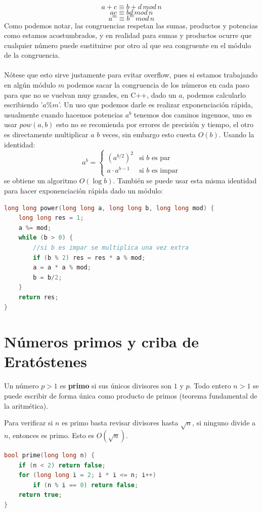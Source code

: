 \[a+c \equiv b+d \, mod \, n\]
\[ac \equiv bd \, mod \, n\]
\[a^m \equiv b^m \, mod \, n\]
Como podemos notar, las congruencias respetan las sumas, productos y potencias como estamos acostumbrados, y en realidad para sumas y productos ocurre que cualquier número puede sustituirse por otro al que sea congruente en el módulo de la congruencia.
\\\\
Nótese que esto sirve justamente para evitar overflow, pues si estamos trabajando en algún módulo $m$ podemos sacar la congruencia de los números en cada paso para que no se vuelvan muy grandes, en C++, dado un $a$, podemos calcularlo escribiendo '$a\% m$'. Un uso que podemos darle es realizar exponenciación rápida, usualmente cuando hacemos potencias $a^b$ tenemos dos caminos ingenuos, uno es usar $pow(a,b)$ esto no se recomienda por errores de precisión y tiempo, el otro es directamente multiplicar $a$ $b$ veces, sin embargo esto cuesta $O(b)$. Usando la identidad:
\[
a^b = \begin{cases} (a^{b/2})^2 & \text{si } b \text{ es par} \\ a \cdot a^{b-1} & \text{si } b \text{ es impar} \end{cases}
\]
se obtiene un algoritmo $O(\log b)$. También se puede usar esta misma identidad para hacer exponenciación rápida dado un módulo:
 
\begin{lstlisting}[language=C++]
long long power(long long a, long long b, long long mod) {
    long long res = 1;
    a %= mod;
    while (b > 0) {
        //si b es impar se multiplica una vez extra
        if (b % 2) res = res * a % mod;
        a = a * a % mod;
        b = b/2;
    }
    return res;
}
\end{lstlisting}

\section{Números primos y criba de Eratóstenes}
 
Un número $p > 1$ es \textbf{primo} si sus únicos divisores son $1$ y $p$. Todo entero $n > 1$ se puede escribir de forma única como producto de primos (teorema fundamental de la aritmética).
 
Para verificar si $n$ es primo basta revisar divisores hasta $\sqrt{n}$, si ninguno divide a $n$, entonces es primo. Esto es $O(\sqrt{n})$.
 
\begin{lstlisting}[language=C++]
bool prime(long long n) {
    if (n < 2) return false;
    for (long long i = 2; i * i <= n; i++)
        if (n % i == 0) return false;
    return true;
}
\end{lstlisting}
 
